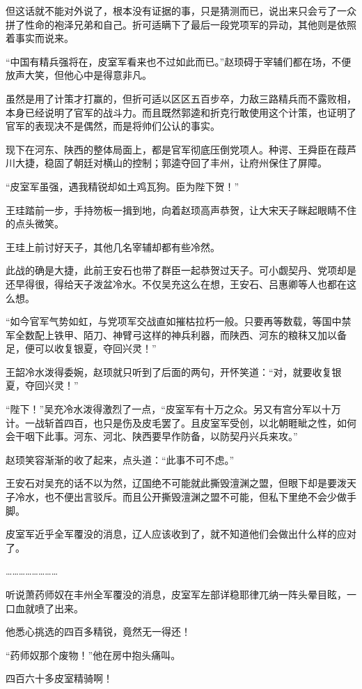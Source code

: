 但这话就不能对外说了，根本没有证据的事，只是猜测而已，说出来只会亏了一众拼了性命的袍泽兄弟和自己。折可适瞒下了最后一段党项军的异动，其他则是依照着事实而说来。

“中国有精兵强将在，皮室军看来也不过如此而已。”赵顼碍于宰辅们都在场，不便放声大笑，但他心中是得意非凡。

虽然是用了计策才打赢的，但折可适以区区五百步卒，力敌三路精兵而不露败相，本身已经说明了官军的战斗力。而且既然郭逵和折克行敢使用这个计策，也证明了官军的表现决不是偶然，而是将帅们公认的事实。

现下在河东、陕西的整体局面上，都是官军彻底压倒党项人。种谔、王舜臣在葭芦川大捷，稳固了朝廷对横山的控制；郭逵夺回了丰州，让府州保住了屏障。

“皮室军虽强，遇我精锐却如土鸡瓦狗。臣为陛下贺！”

王珪踏前一步，手持笏板一揖到地，向着赵顼高声恭贺，让大宋天子眯起眼睛不住的点头微笑。

王珪上前讨好天子，其他几名宰辅却都有些冷然。

此战的确是大捷，此前王安石也带了群臣一起恭贺过天子。可小觑契丹、党项却是还早得很，得给天子泼盆冷水。不仅吴充这么在想，王安石、吕惠卿等人也都在这么想。

“如今官军气势如虹，与党项军交战直如摧枯拉朽一般。只要再等数载，等国中禁军全数配上铁甲、陌刀、神臂弓这样的神兵利器，而陕西、河东的粮秣又加以备足，便可以收复银夏，夺回兴灵！”

王韶冷水泼得委婉，赵顼就只听到了后面的两句，开怀笑道：“对，就要收复银夏，夺回兴灵！”

“陛下！”吴充冷水泼得激烈了一点，“皮室军有十万之众。另又有宫分军以十万计。一战斩首四百，也只是伤及皮毛罢了。且皮室军受创，以北朝睚眦之性，如何会干咽下此事。河东、河北、陕西要早作防备，以防契丹兴兵来攻。”

赵顼笑容渐渐的收了起来，点头道：“此事不可不虑。”

王安石对吴充的话不以为然，辽国绝不可能就此撕毁澶渊之盟，但眼下却是要泼天子冷水，也不便出言驳斥。而且公开撕毁澶渊之盟不可能，但私下里绝不会少做手脚。

皮室军近乎全军覆没的消息，辽人应该收到了，就不知道他们会做出什么样的应对了。

……………………

听说萧药师奴在丰州全军覆没的消息，皮室军左部详稳耶律兀纳一阵头晕目眩，一口血就喷了出来。

他悉心挑选的四百多精锐，竟然无一得还！

“药师奴那个废物！”他在房中抱头痛叫。

四百六十多皮室精骑啊！

